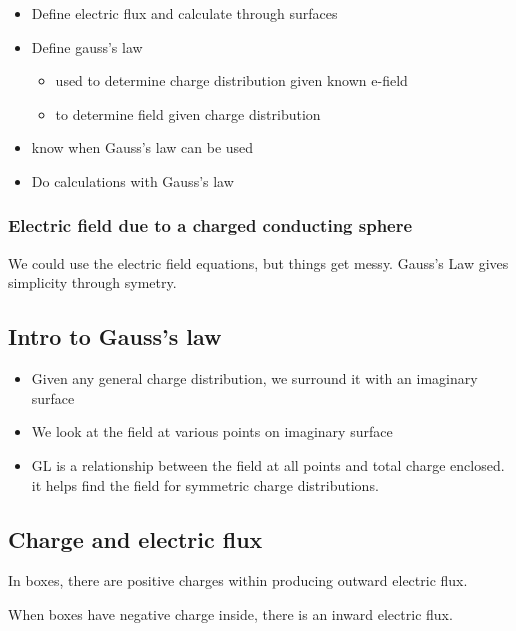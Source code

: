 \begin{itemize}
	\item Define electric flux and calculate through surfaces
	\item Define gauss's law
		\begin{itemize}
			\item used to determine charge distribution given known e-field
			\item to determine field given charge distribution
		\end{itemize}
	\item know when Gauss's law can be used
	\item Do calculations with Gauss's law
\end{itemize}

\subsubsection{Electric field due to a charged conducting sphere}%
\label{ssub:electric_field_due_to_a_charged_conducting_sphere}

We could use the electric field equations, but things get messy. Gauss's Law gives simplicity through symetry.

\subsection{Intro to Gauss's law}%
\label{sub:intro_to_gauss_s_law}

\begin{itemize}
	\item Given any general charge distribution, we surround it with an imaginary surface
	\item We look at the field at various points on imaginary surface
	\item GL is a relationship between the field at all points and total charge enclosed. it helps find the field
		for symmetric charge distributions.
\end{itemize}

\subsection{Charge and electric flux}%
\label{sub:charge_and_electric_flux}

In boxes, there are positive charges within producing outward electric flux.

When boxes have negative charge inside, there is an inward electric flux.

